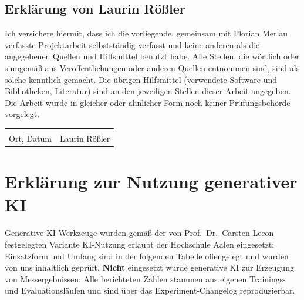 \documentclass[11pt,a4paper]{article}
\let\sfOldSection\section
\renewcommand{\section}{\clearpage\sfOldSection}
\begin{document}
\vspace{1.2cm}
\subsection*{Erklärung von Laurin Rößler}

Ich versichere hiermit, dass ich die vorliegende, gemeinsam mit Florian
Merlau verfasste Projektarbeit selbstständig verfasst und keine anderen als
die angegebenen Quellen und Hilfsmittel benutzt habe. Alle Stellen, die
wörtlich oder sinngemäß aus Veröffentlichungen oder anderen Quellen
entnommen sind, sind als solche kenntlich gemacht. Die übrigen Hilfsmittel
(verwendete Software und Bibliotheken, Literatur) sind an den jeweiligen
Stellen dieser Arbeit angegeben. Die Arbeit wurde in gleicher oder
ähnlicher Form noch keiner Prüfungsbehörde vorgelegt.

\vspace{1.8cm}

\noindent
\begin{tabular}{@{}p{6cm}p{6cm}@{}}
\hrulefill & \hrulefill \\[0.2cm]
Ort, Datum & Laurin Rößler \\
\end{tabular}

\clearpage

\section*{Erklärung zur Nutzung generativer KI}

Generative KI-Werkzeuge wurden gemäß der von Prof.\ Dr.\ Carsten Lecon
festgelegten Variante \glqq KI-Nutzung erlaubt\grqq{} der Hochschule Aalen
eingesetzt; Einsatzform und Umfang sind in der folgenden Tabelle offengelegt
und wurden von uns inhaltlich geprüft. \textbf{Nicht} eingesetzt wurde
generative KI zur Erzeugung von Messergebnissen: Alle berichteten Zahlen
stammen aus eigenen Trainings- und Evaluationsläufen und sind über das
Experiment-Changelog reproduzierbar.

\vspace{0.3cm}
\end{document}
